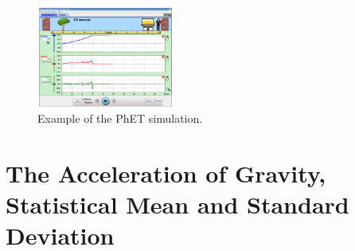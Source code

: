 \documentclass{article}
\begin{document}
\begin{figure}[hb]
\centering
\includegraphics[width=0.4\textwidth]{figures/man.png}
\caption{Example of the PhET simulation.}
\end{figure}

\section{The Acceleration of Gravity, Statistical Mean and Standard Deviation}
\end{document}

